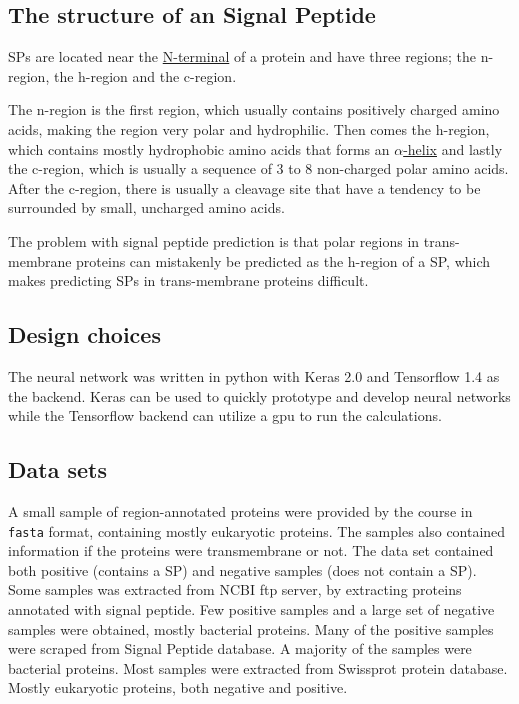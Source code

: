 \subsection{The structure of an Signal Peptide}

SPs are located near the \href{https://en.wikipedia.org/wiki/N-terminus}{N-terminal} of a protein and have three regions; the n-region, the h-region and the c-region.

The n-region is the first region, which usually contains positively charged amino acids, making the region very polar and hydrophilic. Then comes the h-region, which contains mostly hydrophobic amino acids that forms an \href{https://en.wikipedia.org/wiki/Alpha_helix}{$\alpha$-helix} and lastly the c-region, which is usually a sequence of 3 to 8 non-charged polar amino acids. After the c-region, there is usually a cleavage site that have a tendency to be surrounded by small, uncharged amino acids.

The problem with signal peptide prediction is that polar regions in trans-membrane proteins can mistakenly be predicted as the h-region of a SP, which makes predicting SPs in trans-membrane proteins difficult.

\subsection{Design choices}
The neural network was written in python with Keras 2.0 and Tensorflow 1.4 as the backend. Keras can be used to quickly prototype and develop neural networks while the Tensorflow backend can utilize a gpu to run the calculations.

\subsection{Data sets}

A small sample of region-annotated proteins were provided by the course in \verb|fasta| format, containing mostly eukaryotic proteins. The samples also contained information if the proteins were transmembrane or not. The data set contained both positive (contains a SP) and negative samples (does not contain a SP).
Some samples was extracted from NCBI ftp server, by extracting proteins annotated with signal peptide. Few positive samples and a large set of negative samples were obtained, mostly bacterial proteins.
Many of the positive samples were scraped from Signal Peptide database. A majority of the samples were bacterial proteins.
Most samples were extracted from Swissprot protein database. Mostly eukaryotic proteins, both negative and positive.

